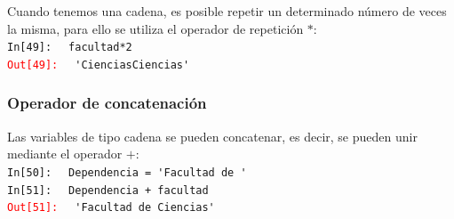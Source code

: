 {\begin{frame}[fragile]
Cuando tenemos una cadena, es posible repetir un determinado número de veces la misma, para ello se utiliza el operador de repetición $*$:
\\
\bigskip
\pause
\textcolor{ao}{\texttt{In[49]: }} \verb| facultad*2|
\\
\pause
\textcolor{red}{\texttt{Out[49]: }} \verb| 'CienciasCiencias'|
\end{frame}
\begin{frame}[fragile]
\frametitle{Operador de concatenación}
Las variables de tipo cadena se pueden concatenar, es decir, se pueden unir mediante el operador $+$:
\\
\bigskip
\pause
\textcolor{ao}{\texttt{In[50]: }} \verb| Dependencia = 'Facultad de '|
\\
\pause
\textcolor{ao}{\texttt{In[51]: }} \verb| Dependencia + facultad|
\\
\pause
\textcolor{red}{\texttt{Out[51]: }} \verb| 'Facultad de Ciencias'|
\end{frame}
}

